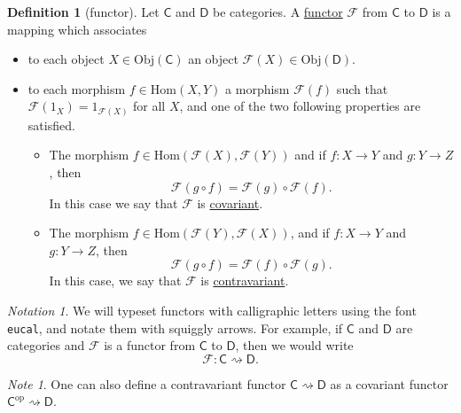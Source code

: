 \documentclass[a4paper]{report}
\newcommand{\defn}[1]{\ul{#1}}
\newcommand{\Obj}{\mathrm{Obj}}
\newcommand{\Hom}{\mathrm{Hom}}
\theoremstyle{definition}
\newtheorem{definition}{Definition}[section]
\theoremstyle{plain}
\theoremstyle{remark}
\newtheorem{note}{Note}[section]
\newtheorem{notation}{Notation}[section]
\begin{document}
\begin{definition}[functor] 
  \label{def:functor} 
  Let $\mathsf{C}$ and $\mathsf{D}$ be categories. A \defn{functor} $\mathcal{F}$ from $\mathsf{C}$ to $\mathsf{D}$ is a mapping which associates 
  \begin{itemize} 
    \item to each object $X \in \Obj(\mathsf{C})$ an object $\mathcal{F}(X) \in \Obj(\mathsf{D})$.

    \item to each morphism $f \in \Hom(X, Y)$ a morphism $\mathcal{F}(f)$ such that $\mathcal{F}(1_{X}) = 1_{\mathcal{F}(X)}$ for all $X$, and one of the two following properties are satisfied.
      \begin{itemize} 
        \item The morphism $f \in \Hom(\mathcal{F}(X), \mathcal{F}(Y))$ and if $f:X \to Y$ and $g\colon Y \to Z$, then 
          \begin{equation*}
            \mathcal{F}(g \circ f) = \mathcal{F}(g) \circ \mathcal{F}(f).
          \end{equation*}
          In this case we say that $\mathcal{F}$ is \defn{covariant}.

        \item The morphism $f \in \Hom(\mathcal{F}(Y), \mathcal{F}(X))$, and if $f\colon X \to Y$ and $g\colon Y \to Z$, then
          \begin{equation*}
            \mathcal{F}(g \circ f) = \mathcal{F}(f) \circ \mathcal{F}(g).
          \end{equation*}
          In this case, we say that $\mathcal{F}$ is \defn{contravariant}.
      \end{itemize} 
  \end{itemize} 
\end{definition}

\begin{notation}
  We will typeset functors with calligraphic letters using the font \texttt{eucal}, and notate them with squiggly arrows. For example, if $\mathsf{C}$ and $\mathsf{D}$ are categories and $\mathcal{F}$ is a functor from $\mathsf{C}$ to $\mathsf{D}$, then we would write
  \begin{equation*}
    \mathcal{F}\colon \mathsf{C} \rightsquigarrow \mathsf{D}.
  \end{equation*}
\end{notation}

\begin{note}
  \label{note:contravariantfunctorisfunctorfromoppositecategory}
  One can also define a contravariant functor $\mathsf{C} \rightsquigarrow \mathsf{D}$ as a covariant functor $\mathsf{C}^{\mathrm{op}} \rightsquigarrow \mathsf{D}$.
\end{note}
\end{document}
